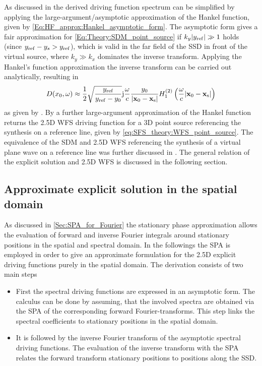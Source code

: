 As discussed in \cite{Spors10ahrens:analysis} the derived driving function spectrum can be simplified by applying the large-argument/asymptotic approximation of the Hankel function, given by \eqref{Eq:HF_approx:Hankel_asymptotic_form}.
The asymptotic form gives a fair approximation for \eqref{Eq:Theory:SDM_point_source} if $k_y |y_{\mathrm{ref}}| \gg 1$ holds (since $y_{\mathrm{ref}}-y_s> y_{\mathrm{ref}}$), which is valid in the far field of the SSD in front of the virtual source, where $k_y \gg k_x$ dominates the inverse transform.
Applying the Hankel's function approximation the inverse transform can be carried out analytically, resulting in
\begin{equation}
D(x_0,\omega) \approx \frac{1}{2} \sqrt{\frac{y_{\mathrm{ref}}}{y_{\mathrm{ref}}-y_0}} \mathrm{j} \frac{\omega}{c} \frac{y_0}{|\mathbf{x}_0-\mathbf{x}_{\mathrm{s}}|} H_1^{(2)}\left( \frac{\omega}{c} |\mathbf{x}_0-\mathbf{x}_{\mathrm{s}}| \right)
\end{equation}
as given by \cite[(24)]{Spors10ahrens:analysis}.
By a further large-argument approximation of the Hankel function returns the 2.5D WFS driving function for a 3D point source referencing the synthesis on a reference line, given by \eqref{eq:SFS_theory:WFS_point_source}.
The equivalence of the SDM and 2.5D WFS referencing the synthesis of a virtual plane wave on a reference line was further discussed in \cite{Firtha2016, Schultz2016:DAGA,Schultz2016}.
The general relation of the explicit solution and 2.5D WFS is discussed in the following section.

\subsection{Approximate explicit solution in the spatial domain}

As discussed in \ref{Sec:SPA_for_Fourier} the stationary phase approximation allows the evaluation of forward and inverse Fourier integrals	around stationary positions in the spatial and spectral domain.
In the followings the SPA is employed in order to give an approximate formulation for the 2.5D explicit driving functions purely in the spatial domain.
The derivation consists of two main steps
\begin{itemize}
%
\item First the spectral driving functions are expressed in an asymptotic form. 
The calculus can be done by assuming, that the involved spectra are obtained via the SPA of the corresponding forward Fourier-transforms. 
This step links the spectral coefficients to stationary positions in the spatial domain.
%
\item It is followed by the inverse Fourier transform of the asymptotic spectral driving functions.
The evaluation of the inverse transform with the SPA relates the forward transform stationary positions to positions along the SSD.
\end{itemize}

